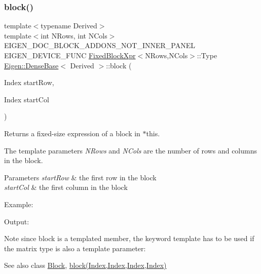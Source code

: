 \subsubsection{\texorpdfstring{block()}{block()}\hspace{0.1cm}{\footnotesize\ttfamily [2/3]}}
{\footnotesize\ttfamily template$<$typename Derived$>$ \\
template$<$int N\+Rows, int N\+Cols$>$ \\
E\+I\+G\+E\+N\+\_\+\+D\+O\+C\+\_\+\+B\+L\+O\+C\+K\+\_\+\+A\+D\+D\+O\+N\+S\+\_\+\+N\+O\+T\+\_\+\+I\+N\+N\+E\+R\+\_\+\+P\+A\+N\+EL E\+I\+G\+E\+N\+\_\+\+D\+E\+V\+I\+C\+E\+\_\+\+F\+U\+NC \mbox{\hyperlink{struct_eigen_1_1_dense_base_1_1_fixed_block_xpr}{Fixed\+Block\+Xpr}}$<$N\+Rows,N\+Cols$>$\+::Type \mbox{\hyperlink{class_eigen_1_1_dense_base}{Eigen\+::\+Dense\+Base}}$<$ Derived $>$\+::block (\begin{DoxyParamCaption}\item[{Index}]{start\+Row,  }\item[{Index}]{start\+Col }\end{DoxyParamCaption})\hspace{0.3cm}{\ttfamily [inline]}}

\begin{DoxyReturn}{Returns}
a fixed-\/size expression of a block in $\ast$this.
\end{DoxyReturn}
The template parameters {\itshape N\+Rows} and {\itshape N\+Cols} are the number of rows and columns in the block.


\begin{DoxyParams}{Parameters}
{\em start\+Row} & the first row in the block \\
\hline
{\em start\+Col} & the first column in the block\\
\hline
\end{DoxyParams}
Example\+: 
\begin{DoxyCodeInclude}{0}
\end{DoxyCodeInclude}
 Output\+: 
\begin{DoxyVerbInclude}
\end{DoxyVerbInclude}


\begin{DoxyNote}{Note}
since block is a templated member, the keyword template has to be used if the matrix type is also a template parameter\+:
\begin{DoxyCode}{0}
\end{DoxyCode}

\end{DoxyNote}
\begin{DoxySeeAlso}{See also}
class \mbox{\hyperlink{class_eigen_1_1_block}{Block}}, \mbox{\hyperlink{class_eigen_1_1_dense_base_ab8e42e67c5cfd5fa13e684642f0f65bf}{block(\+Index,\+Index,\+Index,\+Index)}} 
\end{DoxySeeAlso}
\mbox{\label{class_eigen_1_1_dense_base_ae2823bb4a035d2e6ae3c906f57f5c895}} 
